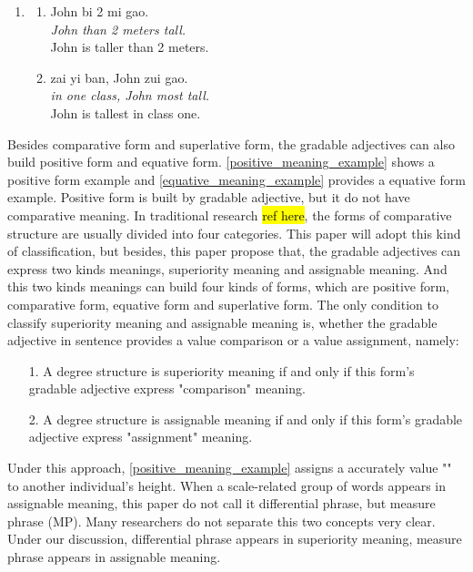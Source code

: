 \documentclass{ctexart}
\begin{document}
\begin{enumerate}[resume]
    \item
    \begin{enumerate}[ref=(\arabic{enumi}\alph*)]
        \item \label{specific_value_comparison_example}
        John bi 2 mi gao.\\
        \textit{John than 2 meters tall.} \\
        John is taller than 2 meters.

        \item \label{individual_set_comparison_example}
        zai yi ban, John zui gao.\\
        \textit{in one class, John most tall.}\\
        John is tallest in class one.

    \end{enumerate}
\end{enumerate}

Besides comparative form and superlative form, the gradable adjectives can also build positive form and equative form. \ref{positive_meaning_example} shows a positive form example and \ref{equative_meaning_example} provides a equative form example. Positive form is built by gradable adjective, but it do not have comparative meaning. In traditional research \hl{ref here}, the forms of comparative structure are usually divided into four categories. This paper will adopt this kind of classification, but besides, this paper propose that, the gradable adjectives can express two kinds meanings, superiority meaning and assignable meaning. And this two kinds meanings can build four kinds of forms, which are positive form, comparative form, equative form and superlative form. The only condition to classify superiority meaning and assignable meaning is, whether the gradable adjective in sentence provides a value comparison or a value assignment, namely:

\begin{itemize}
    \item[1.] A degree structure is superiority meaning if and only if this form's gradable adjective express "comparison" meaning.
    \item[2.] A degree structure is assignable meaning if and only if this form's gradable adjective express "assignment" meaning.
\end{itemize}

Under this approach, \ref{positive_meaning_example} assigns a accurately value "" to another individual's height. When a scale-related group of words appears in assignable meaning, this paper do not call it differential phrase, but measure phrase (MP). Many researchers do not separate this two concepts very clear. Under our discussion, differential phrase appears in superiority meaning, measure phrase appears in assignable meaning. 
\end{document}
